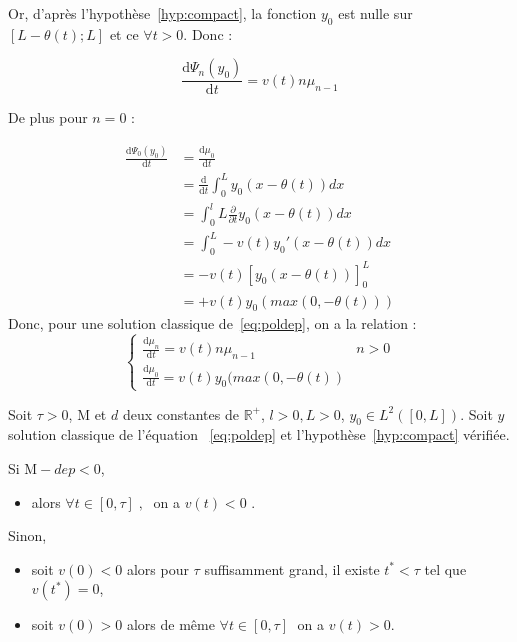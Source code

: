 \documentclass[a4paper]{article}
\newcommand{\mass}{\mathrm{M}}
\newcommand{\dep}{d}
\begin{document}
Or, d'après l'hypothèse~\eqref{hyp:compact}, la fonction $y_0$ est nulle sur $[L-\theta(t);L]$ et ce $\forall t >0$. Donc :

\[\frac{\mathrm{d} \Psi_n (y_0) }{\mathrm{d}t}= v(t) n \mu_{n-1}\]

De plus pour $n=0$ :

\[ 
\begin{split}
\frac{\mathrm{d} \Psi_0 (y_0) }{\mathrm{d}t} &= \frac{\mathrm{d} \mu_0 }{\mathrm{d}t} \\
                                             &= \frac{\mathrm{d}}{\mathrm{d}t}\int_0^L y_0(x-\theta(t)) dx \\
	                                         &= \int_0^lL\frac{\partial}{\partial t}y_0(x-\theta(t)) dx \\
											 &= \int_0^L -v(t)y_0'(x-\theta(t)) dx \\
											 &= -v(t)[y_0(x-\theta(t))]_0^L  \\
											 &= + v(t) y_0(max(0,-\theta(t))) 
\end{split}
\]
Donc, pour une solution classique de~\eqref{eq:poldep}, on a la relation : 
\begin{equation}
	\label{eq:mmt}
\begin{cases}
\displaystyle \frac{\mathrm{d} \mu_n }{\mathrm{d}t} = v(t) n \mu_{n-1} & n>0 \\
\displaystyle \frac{\mathrm{d} \mu_0 }{\mathrm{d}t} = v(t) y_0(max(0,-\theta(t))
\end{cases}
\end{equation}


\begin{proposition}
	\label{prop:v}
	Soit $\tau>0$, $\mass$ et $\dep$ deux constantes de $\mathbb{R}^+$, 
	$l>0, L>0$, $y_0 \in L^2([0,L])$.
	Soit $y$ solution classique de l'équation ~\eqref{eq:poldep} et l'hypothèse~\eqref{hyp:compact} vérifiée.
	
	Si $\mass-dep < 0 $,
	\begin{itemize}
		\item  alors $\forall t \in [0,\tau] \;, \;$ on a $v(t) <0$ . 
	\end{itemize}
	
	Sinon,
	\begin{itemize}
	 \item soit $v(0)<0$ alors pour $\tau$ suffisamment grand, il existe $t^* < \tau$ tel que $v(t^*) = 0 $, 
	 \item soit $v(0) >0$ alors de même $\forall t \in [0,\tau] \;$ on a $v(t) >0$.
	 \end{itemize}
\end{proposition}
\end{document}
